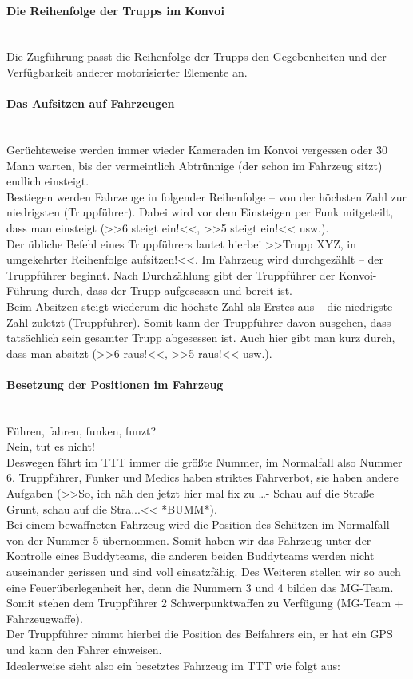 \paragraph{Die Reihenfolge der Trupps im Konvoi} \ \\
	Die Zugführung passt die Reihenfolge der Trupps den Gegebenheiten und der Verfügbarkeit anderer motorisierter Elemente an.

\paragraph{Das Aufsitzen auf Fahrzeugen} \ \\
	Gerüchteweise werden immer wieder Kameraden im Konvoi vergessen oder 30 Mann warten, bis der vermeintlich Abtrünnige (der schon im Fahrzeug sitzt) endlich einsteigt. \\
	Bestiegen werden Fahrzeuge in folgender Reihenfolge – von der höchsten Zahl zur niedrigsten (Truppführer). Dabei wird vor dem Einsteigen per Funk mitgeteilt, dass man einsteigt (>>6 steigt ein!<<, >>5 steigt ein!<< usw.). \\
	Der übliche Befehl eines Truppführers lautet hierbei >>Trupp XYZ, in umgekehrter Reihenfolge aufsitzen!<<.
Im Fahrzeug wird durchgezählt – der Truppführer beginnt. Nach Durchzählung gibt der Truppführer der Konvoi-Führung durch, dass der Trupp aufgesessen und bereit ist. \\
	Beim Absitzen steigt wiederum die höchste Zahl als Erstes aus – die niedrigste Zahl zuletzt (Truppführer). Somit kann der Truppführer davon ausgehen, dass tatsächlich sein gesamter Trupp abgesessen ist. Auch hier gibt man kurz durch, dass man absitzt (>>6 raus!<<, >>5 raus!<< usw.). \\

\paragraph{Besetzung der Positionen im Fahrzeug} \ \\
	Führen, fahren, funken, funzt? \\
	Nein, tut es nicht! \\
	Deswegen fährt im TTT immer die größte Nummer, im Normalfall also Nummer 6. Truppführer, Funker und Medics haben striktes  Fahrverbot, sie haben andere Aufgaben (>>So, ich näh den jetzt hier mal fix zu …- Schau auf die Straße Grunt, schau auf die Stra...<< *BUMM*). \\
	Bei einem bewaffneten Fahrzeug wird die Position des Schützen im Normalfall von der Nummer 5 übernommen. Somit haben wir das Fahrzeug unter der Kontrolle eines Buddyteams, die anderen beiden Buddyteams werden nicht auseinander gerissen und sind voll einsatzfähig. Des Weiteren stellen wir so auch eine Feuerüberlegenheit her, denn die Nummern 3 und 4 bilden das MG-Team. Somit stehen dem Truppführer 2 Schwerpunktwaffen zu Verfügung (MG-Team + Fahrzeugwaffe). \\
	Der Truppführer nimmt hierbei die Position des Beifahrers ein, er hat ein GPS und kann den Fahrer einweisen. \\
	Idealerweise sieht also ein besetztes Fahrzeug im TTT wie folgt aus:

